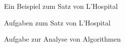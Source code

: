 \begin{frame}{Ein Beispiel zum Satz von L'Hospital}
\begin{example}

\end{example}
\end{frame}

\begin{frame}{Aufgaben zum Satz von L'Hospital}
\begin{task}

\end{task}
\end{frame}

\begin{frame}{Aufgabe zur Analyse von Algorithmen}
\begin{task}

\end{task}
\end{frame}
